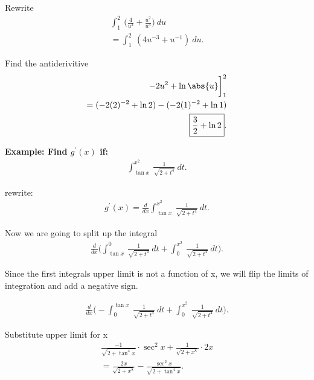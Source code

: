 \documentclass{report}
\begin{document}
\bigbreak \noindent \bigbreak \noindent
Rewrite
\begin{align*}
  \int_{1}^{2}\ \bigg(\frac{4}{u^{3}} + \frac{u^{2}}{u^{3}}\bigg)\ du \\
  = \int_{1}^{2}\ (4u^{-3} + u^{-1})\ du
.\end{align*}

\bigbreak \noindent \bigbreak \noindent
Find the antiderivitive
\begin{align*}
-2u^{2} + \ln{\abs{u}}\bigg]_{1}^{2} \\
= (-2(2)^{-2} + \ln{2}) - ( -2(1)^{-2} + \ln{1}) \\
\boxed{\frac{3}{2} + \ln{2}}
.\end{align*}

\bigbreak \noindent 
\begin{mdframed}
  \textbf{Example: Find $g^{\prime}(x)$ if:} 
  \begin{align*}
    \int_{\tan{x}}^{x^{2}}\ \frac{1}{\sqrt{2+t^{4}}}\ dt
  .\end{align*}
\end{mdframed}

\bigbreak \noindent \bigbreak \noindent
rewrite:
\begin{align*}
  g^{\prime}(x) = \frac{d}{dx}\int_{\tan{x}}^{x^{2}}\ \frac{1}{\sqrt{2+t^{4}}}\ dt 
.\end{align*}

\bigbreak \noindent \bigbreak \noindent
Now we are going to split up the integral
\begin{align*}
  \frac{d}{dx}\bigg(\int_{\tan{x}}^{0}\ \frac{1}{\sqrt{2+t^{4}}}\ dt + \int_{0}^{x^{2}}\ \frac{1}{\sqrt{2+t^{4}}}\ dt\bigg) 
.\end{align*}

\bigbreak \noindent \bigbreak \noindent
Since the first integrals upper limit is not a function of x, we will flip the limits of integration and add a negative sign.

\begin{align*}
  \frac{d}{dx}\bigg(-\int_{0}^{\tan{x}}\ \frac{1}{\sqrt{2+t^{4}}}\ dt + \int_{0}^{x^{2}}\ \frac{1}{\sqrt{2+t^{4}}}\ dt\bigg) 
.\end{align*}

\bigbreak \noindent \bigbreak \noindent
Substitute upper limit for x
\begin{align*}
  \frac{-1}{\sqrt{2+\tan^{4}{x}}} \cdot \sec^{2}{x} + \frac{1}{\sqrt{2+x^{8}}} \cdot 2x \\
  \boxed{= \frac{2x}{\sqrt{2+x^{8}}} - \frac{\sec^{2}{x}}{\sqrt{2+\tan^{4}{x}}}}
.\end{align*}
\end{document}
